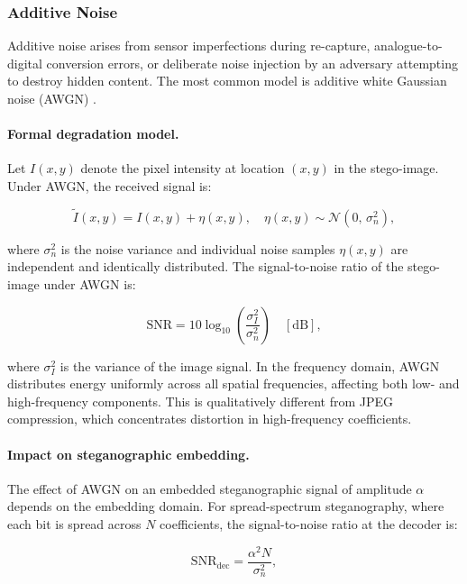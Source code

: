 \documentclass[12pt,a4paper,oneside]{report}
\begin{document}
	\subsubsection{Additive Noise}
	
	Additive noise arises from sensor imperfections during re-capture, analogue-to-digital conversion
	errors, or deliberate noise injection by an adversary attempting to destroy hidden content. The
	most common model is additive white Gaussian noise (AWGN) \cite{gonzalez2008digital}.
	
	\paragraph{Formal degradation model.}
	Let $I(x,y)$ denote the pixel intensity at location $(x,y)$ in the stego-image. Under AWGN,
	the received signal is:
	
	\begin{equation}
		\tilde{I}(x,y) = I(x,y) + \eta(x,y), \quad
		\eta(x,y) \sim \mathcal{N}(0,\, \sigma_n^2),
		\label{eq:awgn}
	\end{equation}
	
	where $\sigma_n^2$ is the noise variance and individual noise samples $\eta(x,y)$ are independent
	and identically distributed. The signal-to-noise ratio of the stego-image under AWGN is:
	
	\begin{equation}
		\mathrm{SNR} = 10 \log_{10} \!\left( \frac{\sigma_I^2}{\sigma_n^2} \right) \quad [\mathrm{dB}],
		\label{eq:snr}
	\end{equation}
	
	where $\sigma_I^2$ is the variance of the image signal. In the frequency domain, AWGN distributes
	energy uniformly across all spatial frequencies, affecting both low- and high-frequency components.
	This is qualitatively different from JPEG compression, which concentrates distortion in
	high-frequency coefficients.
	
	\paragraph{Impact on steganographic embedding.}
	The effect of AWGN on an embedded steganographic signal of amplitude $\alpha$ depends on the
	embedding domain. For spread-spectrum steganography, where each bit is spread across $N$
	coefficients, the signal-to-noise ratio at the decoder is:
	
	\begin{equation}
		\mathrm{SNR}_\text{dec} = \frac{\alpha^2 N}{\sigma_n^2},
		\label{eq:ss_snr}
	\end{equation}
	
\end{document}
